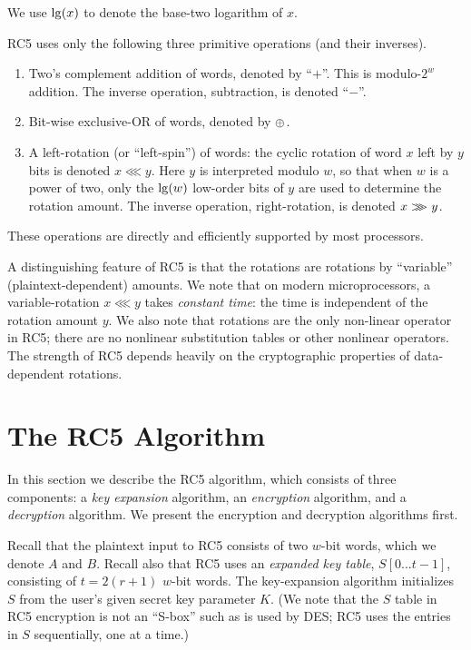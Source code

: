 We use ${\rm lg}(x)$ to denote the base-two logarithm of $x$.  

RC5 uses only the following three primitive operations (and their inverses).
\begin{enumerate} 

\item 
Two's complement addition of words, denoted by ``$+$''.  This is
modulo-$2^w$ addition.  The inverse operation, subtraction, is denoted
``$-$''.

\item 
Bit-wise exclusive-OR of words, denoted by $\oplus$.  

\item A left-rotation (or ``left-spin'') of words: the cyclic rotation
of word $x$ left by $y$ bits is denoted $x \lll y$.  
Here $y$ is interpreted modulo $w$, so that
when $w$ is a power of two, 
only the ${\rm lg}(w)$ low-order bits of $y$ are used to
determine the rotation amount.
The inverse operation, right-rotation, is denoted $x >\!\!\!>\!\!\!> y$.

\end{enumerate}
These operations are directly and efficiently supported by most
processors. 

A distinguishing feature of RC5 is that the rotations are rotations by
``variable'' (plaintext-dependent) amounts.  We note that on modern
microprocessors, a variable-rotation $x\lll y$ takes {\em constant time}:
the time is independent of the rotation amount $y$.  We also note
that rotations are the only non-linear operator in RC5; there are no
nonlinear substitution tables or other nonlinear operators.  The
strength of RC5 depends heavily on the cryptographic properties of
data-dependent rotations.

\section{The RC5 Algorithm}

In this section we describe the RC5 algorithm, which consists of
three components: a {\em key expansion}
algorithm, an {\em encryption} algorithm, and a {\em decryption}
algorithm.  We present the encryption and decryption algorithms first.

Recall that the plaintext input to RC5 consists of two $w$-bit
words, which we denote $A$ and $B$.  Recall also that RC5 uses an
{\em expanded key table}, $S[0...t-1]$, consisting of $t=2(r+1)$
$w$-bit words.  The key-expansion algorithm initializes $S$ from the
user's given secret key parameter $K$.  (We note that the $S$ table in
RC5 encryption is not an ``S-box'' such as is used by DES; RC5 uses
the entries in $S$ sequentially, one at a time.)

